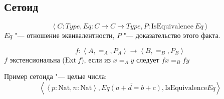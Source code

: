 
\subsection{\texorpdfstring{Сетоид}{Setoid}}

\begin{definition}
    \[
        \left<C : Type, Eq : C \to C \to Type, P : \mathrm{IsEquivalence}~Eq\right>
    \]
    $Eq$ "--- отношение эквивалентности, $P$ "--- доказательство этого факта.
\end{definition}
\begin{definition}[экстенциональность]
    \[
        f : \left< A, =_A, P_A\right> \to \left<B, =_B, P_B\right>
    \]
    $f$ экстенсиональна ($\mathrm{Ext}~f$), если из $x =_A y$ следует $f x =_B f y$
\end{definition}

Пример сетоида "--- целые числа:
\[
    \left< \left<p : \mathrm{Nat}, n : \mathrm{Nat}\right>, \overline{Eq(a+d=b+c)}, \mathrm{IsEquivalence} Eq\right>
\]
